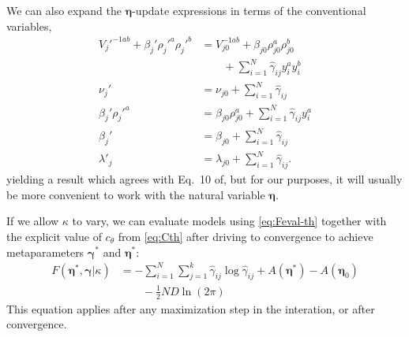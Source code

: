 \documentclass[aps,showpacs,twocolumn,prd,superscriptaddress,nofootinbib]{revtex4}
\newcommand{\nn}{\nonumber}
\begin{document}
We can also expand the $\bm\eta$-update expressions in terms of the conventional variables, 
\begin{align}
  V_j'^{-1ab}+\beta_j'\rho_j'^a\rho_j'^b
  &=  V_{j0}^{-1ab}+\beta_{j0}\rho_{j0}^a\rho_{j0}^b
  \nn\\&\qquad
  +\sum_{i=1}^N\hat\gamma_{ij}y_i^ay_i^b 
  \nn\\
  \nu_j'
  &=\nu_{j0}
    +\sum_{i=1}^N\hat\gamma_{ij}
  \nn\\
  \beta_j'\rho_j'^a
  &=  \beta_{j0}\rho_{j0}^a+\sum_{i=1}^N\hat\gamma_{ij}y_i^a 
  \nn\\
  \beta_j'
  &=
  \beta_{j0}+\sum_{i=1}^N\hat\gamma_{ij}
  \nn\\
  \lambda'_{j}&=
  \lambda_{j0}+\sum_{i=1}^N\hat\gamma_{ij}.\label{eq:meta-update}
\end{align}
yielding a result which agrees with Eq.~10 of\cite{Attias2000}, but for our purposes, it will usually be more convenient to work with the natural variable $\bm\eta$.


If we allow $\kappa$ to vary, we can evaluate models using \eqref{eq:Feval-th} together with the explicit value of $c_\theta$ from \eqref{eq:Cth} after driving to convergence to achieve metaparameters $\bm\gamma^*$ and $\bm\eta^*$:
\begin{align}
    F(\bm\eta^*,\bm\gamma|\kappa)&=
    -\sum_{i=1}^N\sum_{j=1}^k\hat\gamma_{ij}\log\hat\gamma_{ij}
    +A(\bm\eta^*)-A(\bm\eta_{0})
  \nn\\&\qquad
  -\frac12ND\ln(2\pi)
  \label{eq:computeF}
\end{align}
This equation applies after any maximization step in the interation, or after convergence.
\end{document}
